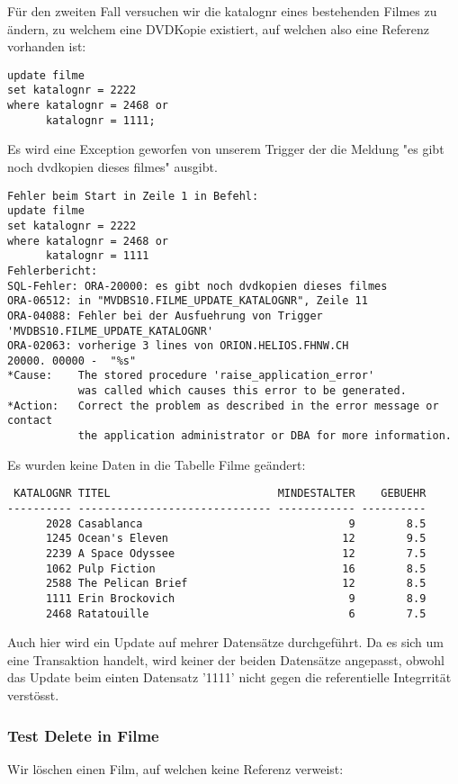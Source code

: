\documentclass[11pt,a4paper,parskip=half]{scrartcl}
\begin{document}
Für den zweiten Fall versuchen wir die katalognr eines bestehenden Filmes zu ändern, zu welchem eine DVDKopie existiert, auf welchen also eine Referenz vorhanden ist:

\begin{lstlisting}
update filme
set katalognr = 2222
where katalognr = 2468 or 
      katalognr = 1111;
\end{lstlisting}

Es wird eine Exception geworfen von unserem Trigger der die Meldung "es gibt noch dvdkopien dieses filmes" ausgibt.

\begin{lstlisting}
Fehler beim Start in Zeile 1 in Befehl:
update filme
set katalognr = 2222
where katalognr = 2468 or 
      katalognr = 1111
Fehlerbericht:
SQL-Fehler: ORA-20000: es gibt noch dvdkopien dieses filmes
ORA-06512: in "MVDBS10.FILME_UPDATE_KATALOGNR", Zeile 11
ORA-04088: Fehler bei der Ausfuehrung von Trigger 'MVDBS10.FILME_UPDATE_KATALOGNR'
ORA-02063: vorherige 3 lines von ORION.HELIOS.FHNW.CH
20000. 00000 -  "%s"
*Cause:    The stored procedure 'raise_application_error'
           was called which causes this error to be generated.
*Action:   Correct the problem as described in the error message or contact
           the application administrator or DBA for more information.
\end{lstlisting}

Es wurden keine Daten in die Tabelle Filme geändert:

\begin{lstlisting}
 KATALOGNR TITEL                          MINDESTALTER    GEBUEHR
---------- ------------------------------ ------------ ----------
      2028 Casablanca                                9        8.5 
      1245 Ocean's Eleven                           12        9.5 
      2239 A Space Odyssee                          12        7.5 
      1062 Pulp Fiction                             16        8.5 
      2588 The Pelican Brief                        12        8.5 
      1111 Erin Brockovich                           9        8.9 
      2468 Ratatouille                               6        7.5 
\end{lstlisting}

Auch hier wird ein Update auf mehrer Datensätze durchgeführt. Da es sich um eine Transaktion handelt, wird keiner der beiden Datensätze angepasst, obwohl das Update beim einten Datensatz '1111' nicht gegen die referentielle Integrrität verstösst.

\subsubsection{Test Delete in Filme}
Wir löschen einen Film, auf welchen keine Referenz verweist:
\end{document}
